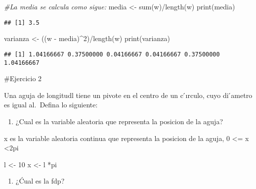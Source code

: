 \documentclass[
]{article}
\newenvironment{Shaded}{\begin{snugshade}}{\end{snugshade}}
\newcommand{\CommentTok}[1]{\textcolor[rgb]{0.56,0.35,0.01}{\textit{#1}}}
\newcommand{\DecValTok}[1]{\textcolor[rgb]{0.00,0.00,0.81}{#1}}
\newcommand{\FunctionTok}[1]{\textcolor[rgb]{0.00,0.00,0.00}{#1}}
\newcommand{\NormalTok}[1]{#1}
\newcommand{\OtherTok}[1]{\textcolor[rgb]{0.56,0.35,0.01}{#1}}
\newcommand{\SpecialCharTok}[1]{\textcolor[rgb]{0.00,0.00,0.00}{#1}}
\providecommand{\tightlist}{%
  \setlength{\itemsep}{0pt}\setlength{\parskip}{0pt}}
\begin{document}
\begin{Shaded}
\begin{Highlighting}[]
\CommentTok{\#La media se calcula como sigue:}
\NormalTok{media }\OtherTok{\textless{}{-}} \FunctionTok{sum}\NormalTok{(w)}\SpecialCharTok{/}\FunctionTok{length}\NormalTok{(w)}
\FunctionTok{print}\NormalTok{(media)}
\end{Highlighting}
\end{Shaded}

\begin{verbatim}
## [1] 3.5
\end{verbatim}

\begin{Shaded}
\begin{Highlighting}[]
\NormalTok{varianza }\OtherTok{\textless{}{-}}\NormalTok{ ((w }\SpecialCharTok{{-}}\NormalTok{ media)}\SpecialCharTok{\^{}}\DecValTok{2}\NormalTok{)}\SpecialCharTok{/}\FunctionTok{length}\NormalTok{(w)}
\FunctionTok{print}\NormalTok{(varianza)}
\end{Highlighting}
\end{Shaded}

\begin{verbatim}
## [1] 1.04166667 0.37500000 0.04166667 0.04166667 0.37500000 1.04166667
\end{verbatim}

\#Ejercicio 2

Una aguja de longitudl tiene un pivote en el centro de un c ́ırculo,
cuyo di ́ametro es igual al.~Defina lo siguiente:

\begin{enumerate}
\def\labelenumi{\alph{enumi})}
\tightlist
\item
  ¿Cual es la variable aleatoria que representa la posicion de la aguja?
\end{enumerate}

x es la variable aleatoria continua que representa la posicion de la
aguja, 0 \textless= x \textless2pi

\begin{Shaded}
\begin{Highlighting}[]
\NormalTok{l }\OtherTok{\textless{}{-}} \DecValTok{10}
\NormalTok{x }\OtherTok{\textless{}{-}}\NormalTok{ l }\SpecialCharTok{*}\NormalTok{pi}
\end{Highlighting}
\end{Shaded}

\begin{enumerate}
\def\labelenumi{\alph{enumi})}
\setcounter{enumi}{1}
\tightlist
\item
  ¿Ćual es la fdp?
\end{enumerate}
\end{document}
